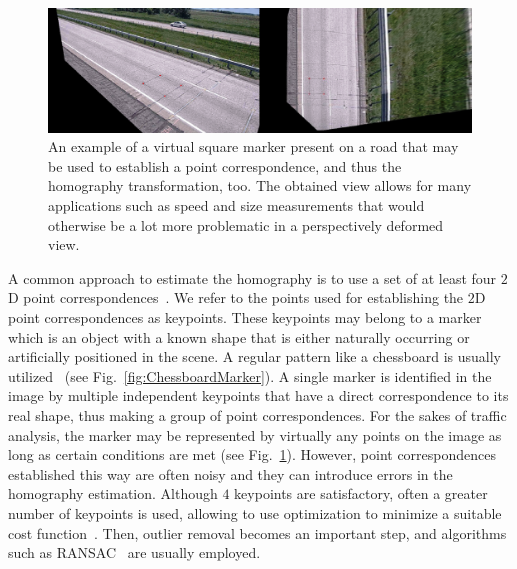 \begin{figure}[t]
    \centerline{\includegraphics[width=\linewidth]{figures/homography/homography_road.png}}
    \caption[Square marker on a road]{An example of a virtual square marker present on a road that may be used to establish a point correspondence, and thus the homography transformation, too. The obtained view allows for many applications such as speed and size measurements that would otherwise be a lot more problematic in a perspectively deformed view. }
    \label{fig:RoadMarker}
\end{figure}

A common approach to estimate the homography is to use a set of at least four $2$D point correspondences~\cite{hartley1997defense}. We refer to the points used for establishing the $2$D point correspondences as keypoints. These keypoints may belong to a marker which is an object with a known shape that is either naturally occurring or artificially positioned in the scene. A regular pattern like a chessboard is usually utilized~\cite{zhang2016flexible} (see Fig.~\ref{fig:ChessboardMarker}). A single marker is identified in the image by multiple independent keypoints that have a direct correspondence to its real shape, thus making a group of point correspondences. For the sakes of traffic analysis, the marker may be represented by virtually any points on the image as long as certain conditions are met (see Fig.~\ref{fig:RoadMarker}). However, point correspondences established this way are often noisy and they can introduce errors in the homography estimation. Although $4$ keypoints are satisfactory, often a greater number of keypoints is used, allowing to use optimization to minimize a suitable cost function~\cite{osuna2016multiobjective, mou2013robust}. Then, outlier removal becomes an important step, and algorithms such as RANSAC~\cite{fischler1981random} are usually employed.

